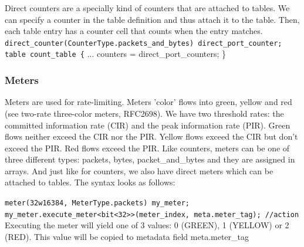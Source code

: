 \documentclass[11pt,oneside,a4paper]{article}
\begin{document}
\newpage

\noindent Direct counters are a specially kind of counters that are attached to tables. We can specify a counter in the table definition and thus attach it to the table. Then, each table entry has a counter cell that counts when the entry matches. \newline
\indent \texttt{direct\_counter(CounterType.packets\_and\_bytes) direct\_port\_counter;} \newline
\indent \texttt{table count\_table \{} \newline
\indent \indent ... \newline
\indent \indent counters = direct\_port\_counters; \newline
\indent \}

\subsubsection{Meters}

Meters are used for rate-limiting. Meters 'color' flows into green, yellow and red (see two-rate three-color meters, RFC2698). We have two threshold rates: the committed information rate (CIR) and the peak information rate (PIR). Green flows neither exceed the CIR nor the PIR. Yellow flows exceed the CIR but don't exceed the PIR. Red flows exceed the PIR. Like counters, meters can be one of three different types: packets, bytes, packet\_and\_bytes and they are assigned in arrays. And just like for counters, we also have direct meters which can be attached to tables. The syntax looks as follows:

\indent \texttt{meter(32w16384, MeterType.packets) my\_meter;} \newline
\indent	\texttt{my\_meter.execute\_meter<bit<32>>(meter\_index, meta.meter\_tag); //action}\\

\noindent Executing the meter will yield one of 3 values: 0 (GREEN), 1 (YELLOW) or 2 (RED). This value will be copied to metadata field meta.meter\_tag
\end{document}
